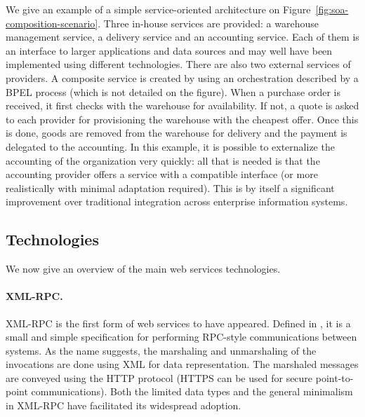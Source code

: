 We give an example of a simple service-oriented architecture on Figure~\ref{fig:soa-composition-scenario}. Three in-house services are provided: a warehouse management service, a delivery service and an accounting service. Each of them is an interface to larger applications and data sources and may well have been implemented using different technologies. There are also two external services of providers. A composite service is created by using an orchestration described by a BPEL process (which is not detailed on the figure). When a purchase order is received, it first checks with the warehouse for availability. If not, a quote is asked to each provider for provisioning the warehouse with the cheapest offer. Once this is done, goods are removed from the warehouse for delivery and the payment is delegated to the accounting.
%
In this example, it is possible to externalize the accounting of the organization very quickly: all that is needed is that the accounting provider offers a service with a compatible interface (or more realistically with minimal adaptation required). This is by itself a significant improvement over traditional integration across enterprise information systems.


\subsection{Technologies}


We now give an overview of the main web services technologies.

\paragraph{XML-RPC.}
XML-RPC is the first form of web services to have appeared. Defined in \cite{DW98}, it is a small and simple specification for performing RPC-style communications between systems. As the name suggests, the marshaling and unmarshaling of the invocations are done using XML for data representation. The marshaled messages are conveyed using the HTTP protocol (HTTPS can be used for secure point-to-point communications). Both the limited data types and the general minimalism in XML-RPC have facilitated its widespread adoption.

